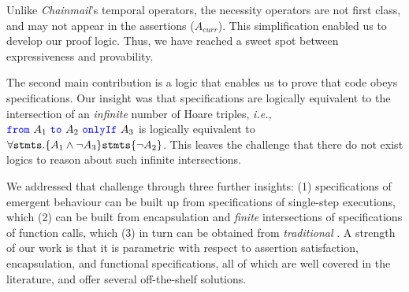   
Unlike  \emph{Chainmail}'s temporal operators, 
 the necessity operators %
 are  not first class, and may not appear in the assertions  {(\eg  ${A_{curr}}$)}. 
 This simplification enabled us to develop our proof logic. 
 Thus, we {have reached} a  sweet spot between expressiveness and 
 provability.
 
 
 \vspace{.07in}
 The second main contribution is  a logic that  enables us to prove that code 
 obeys \Nec specifications. {}
{Our insight was  that \Nec specifications are logically equivalent to the
intersection of an \emph{infinite} number of Hoare triples, \emph{i.e.,} 
${\color{blue}\texttt{from}}\ A_1\ {\color{blue}\texttt{to}}\ A_2\ {\color{blue}\texttt{onlyIf}}\ A_3$ is 
logically equivalent
{to}
 $\forall {\texttt{stmts}}. \{ A_1 \wedge \neg A_3\} {\texttt{stmts}} \{ \neg A_2 \}$.
 This leaves the challenge that there do not exist logics to reason about such infinite intersections.}

{We addressed that  challenge} through three further insights: 
 {(1) \Nec specifications of emergent behaviour can be built up from \Nec specifications of
 single-step executions, which (2) can be built from encapsulation and \emph{finite} intersections
 of \Nec specifications of function calls, which  
 (3) in turn can be obtained from \emph{traditional} \funcSpecs.}
{A strength of our} work %
is {that it is
parametric} with respect to assertion
satisfaction, encapsulation, {and functional specifications, all of which are well covered in the literature},
{and offer several off-the-shelf solutions.}
 


